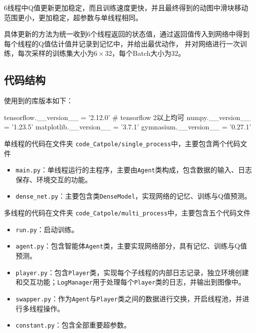 \documentclass[12pt, a4paper, oneside]{ctexart}
\numberwithin{equation}{section}  %
\begin{document}
6线程中Q值更新更加稳定，而且训练速度更快，并且最终得到的动图中滑块移动范围更小，更加稳定，超参数与单线程相同。

具体更新的方法为统一收到6个线程返回的状态值，通过返回值传入到网络中得到每个线程的Q值估计值并记录到记忆中，并给出最优动作，
并对网络进行一次训练，每次采样的训练集大小为$6\times 32$，每个Batch大小为$32$。

\subsection{代码结构}
使用到的库版本如下：
\begin{pythoncode}
    tensorflow.__version__ = '2.12.0'  # tensorflow 2以上均可
    numpy.__version__ = '1.23.5'
    matplotlib.__version__ = '3.7.1'
    gymnasium.__version__ = '0.27.1'
\end{pythoncode}

\noindent 单线程的代码在文件夹 \texttt{code\_Catpole/single\_process}中，主要包含两个代码文件
\begin{itemize}
    \item \texttt{main.py}：单线程运行的主程序，主要由\texttt{Agent}类构成，包含数据的输入、日志保存、环境交互的功能。
    \item \texttt{dense\_net.py}：主要包含类\texttt{DenseModel}，实现网络的记忆、训练与Q值预测。
\end{itemize}

\noindent 多线程的代码在文件夹 \texttt{code\_Catpole/multi\_process}中，主要包含五个代码文件
\begin{itemize}
    \item \texttt{run.py}：启动训练。
    \item \texttt{agent.py}：包含智能体\texttt{Agent}类，主要实现网络部分，具有记忆、训练与Q值预测。
    \item \texttt{player.py}：包含\texttt{Player}类，实现每个子线程的内部日志记录，独立环境创建和交互功能；\texttt{LogManager}用于处理每个\texttt{Player}类的日志，并输出到图像中。
    \item \texttt{swapper.py}：作为\texttt{Agent}与\texttt{Player}类之间的数据进行交换，开启线程池，并进行多线程操作。
    \item \texttt{constant.py}：包含全部重要超参数。
\end{itemize}
\end{document}

